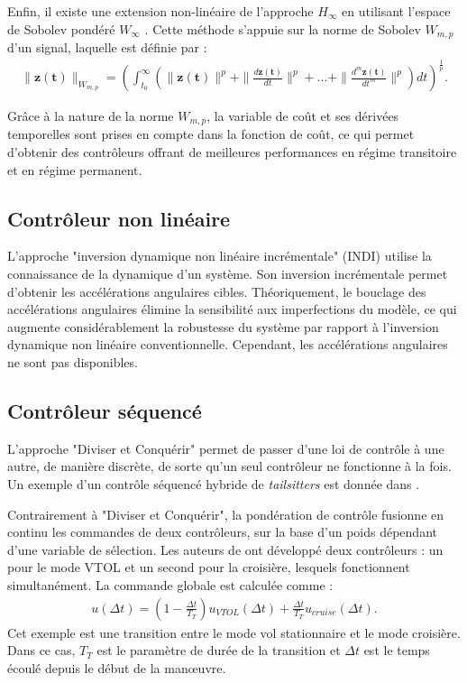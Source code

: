 Enfin, il existe une extension non-linéaire de l'approche $H_{\infty}$ en utilisant l'espace de Sobolev pondéré $W_{\infty}$ \cite{cardoso2018nonlinear, CardosoEsteban2019, cardoso2021robust, cardoso2024robust}. Cette méthode s'appuie sur la norme de Sobolev $W_{m,p}$  d'un signal, laquelle est définie par :
\begin{align*}
    \|\boldsymbol{z(t)}\|_{W_{m,p}} = \left( \int_{t_{0}}^{\infty}(\|\boldsymbol{z(t)}\|^{p} + \|\frac{d \boldsymbol{z(t)}}{dt}\|^{p} + ... + \|\frac{d^{m} \boldsymbol{z(t)}}{dt^{m}}\|^{p}) dt \right)^{\frac{1}{p}}.
\end{align*}  

Grâce à la nature de la norme $W_{m,p}$, la variable de coût et ses dérivées temporelles sont prises en compte dans la fonction de coût, ce qui permet d'obtenir des contrôleurs offrant de meilleures performances en régime transitoire et en régime permanent.

\subsection*{Contrôleur non linéaire}
L'approche "inversion dynamique non linéaire incrémentale" (INDI) utilise la connaissance de la dynamique d'un système. Son inversion incrémentale permet d'obtenir les accélérations angulaires cibles. Théoriquement, le bouclage des accélérations angulaires élimine la sensibilité aux imperfections du modèle, ce qui augmente considérablement la robustesse du système par rapport à l'inversion dynamique non linéaire conventionnelle. Cependant, les accélérations angulaires ne sont pas disponibles.

\cite{Sieberling2010, Binz2019, smeurINDI,smeurINDITail}

\subsection*{Contrôleur séquencé}
L'approche "Diviser et Conquérir" permet de passer d'une loi de contrôle à une autre, de manière discrète, de sorte qu'un seul contrôleur ne fonctionne à la fois. Un exemple d'un contrôle séquencé hybride de \textit{tailsitters} est donnée dans \cite{Casau2011}.

Contrairement à "Diviser et Conquérir", la pondération de contrôle fusionne en continu les commandes de deux contrôleurs, sur la base d'un poids dépendant d'une variable de sélection. Les auteurs de \cite{Liang2016} ont développé deux contrôleurs : un pour le mode VTOL et un second pour la croisière, lesquels fonctionnent simultanément. La commande globale est calculée comme  :
\begin{align*}
    u(\Delta t) = (1 - \frac{\Delta t}{T_{T}})u_{VTOL}(\Delta t) + \frac{\Delta t}{T_{T}}u_{cruise}(\Delta t).
\end{align*}
Cet exemple est une transition entre le mode vol stationnaire et le mode croisière. Dans ce cas, $T_{T}$ est le paramètre de durée de la transition et $\Delta t$ est le temps écoulé depuis le début de la manœuvre.

